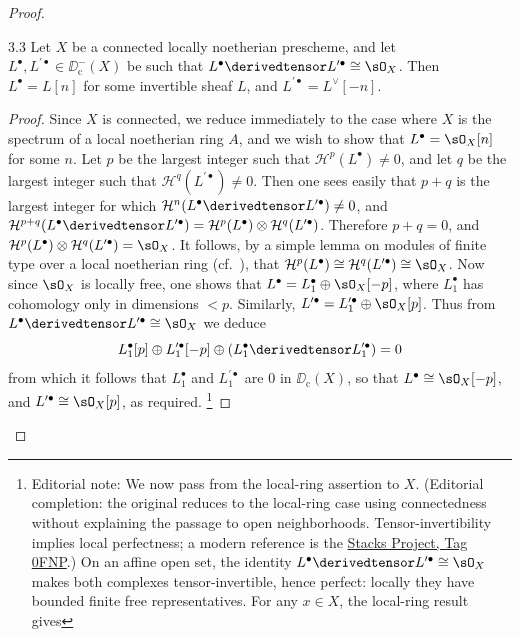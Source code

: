 \begin{proof}
\begin{booklemma}{3.3}\label{lem:5.3.3}
Let $X$ be a connected locally noetherian prescheme, and let $L^\bullet,L^{\prime\bullet}\in\DD_{\mathrm{c}}^{-}(X)$ be such that $L^\bullet\derivedtensor L^{\prime\bullet}\cong\sO_X$. Then $L^\bullet=L[n]$ for some invertible sheaf $L$, and $L^{\prime\bullet}=L^{\vee}[-n]$.
\end{booklemma}

\begin{proof}
Since $X$ is connected, we reduce immediately to the case where $X$ is the spectrum of a local noetherian ring $A$, and we wish to show that $L^\bullet=\sO_X[n]$ for some $n$. Let $p$ be the largest integer such that $\mathcal{H}^p(L^\bullet)\neq0$, and let $q$ be the largest integer such that $\mathcal{H}^q(L^{\prime\bullet})\neq0$. Then one sees easily that $p+q$ is the largest integer for which $\mathcal{H}^n(L^\bullet\derivedtensor L^{\prime\bullet})\neq0$, and $\mathcal{H}^{p+q}(L^\bullet\derivedtensor L^{\prime\bullet})=\mathcal{H}^p(L^\bullet)\otimes \mathcal{H}^q(L^{\prime\bullet})$. Therefore $p+q=0$, and $\mathcal{H}^p(L^\bullet)\otimes \mathcal{H}^q(L^{\prime\bullet})=\sO_X$. It follows, by a simple lemma on modules of finite type over a local noetherian ring (cf.\ \cite[,~5.4.3]{EGA}), that $\mathcal{H}^p(L^\bullet)\cong \mathcal{H}^q(L^{\prime\bullet})\cong\sO_X$. Now since $\sO_X$ is locally free, one shows that $L^\bullet = L_1^\bullet\oplus\sO_X[-p]$, where $L_1^\bullet$ has cohomology only in dimensions $<p$. Similarly, $L^{\prime\bullet}=L_1^{\prime\bullet}\oplus\sO_X[p]$. Thus from $L^\bullet\derivedtensor L^{\prime\bullet}\cong\sO_X$ we deduce
\[
L_{1}^{\bullet}[p]\oplus L_{1}^{\prime\bullet}[-p]\oplus (L_{1}^{\bullet}\derivedtensor L_{1}^{\prime\bullet}) = 0
\]
from which it follows that $L_1^\bullet$ and $L_1^{\prime\bullet}$ are $0$ in $\DD_{\mathrm{c}}(X)$, so that $L^\bullet\cong\sO_X[-p]$, and $L^{\prime\bullet}\cong\sO_X[p]$, as required.
\footnote{Editorial note: We now pass from the local-ring assertion to $X$. (Editorial completion: the original reduces to the local-ring case using connectedness without explaining the passage to open neighborhoods. Tensor-invertibility implies local perfectness; a modern reference is the \href{https://stacks.math.columbia.edu/tag/0FNP}{Stacks Project, Tag 0FNP}.)
On an affine open set, the identity $L^\bullet\derivedtensor L^{\prime\bullet}\cong\sO_X$ makes both complexes tensor-invertible, hence perfect: locally they have bounded finite free representatives. For any $x\in X$, the local-ring result gives
}
\end{proof}
\end{proof}
